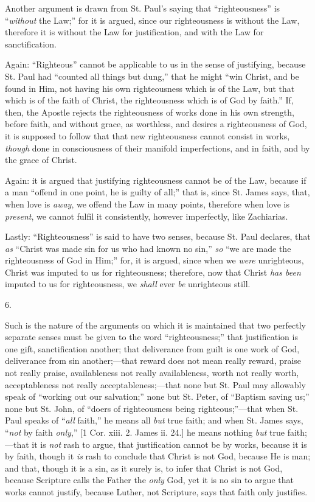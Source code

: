 Another argument is drawn from St. Paul's saying that
``righteousness'' is ``\emph{without} the Law;'' for
it is argued, since our righteousness is without the Law, therefore it
is without the Law for justification, and with the Law for
sanctification.

Again: ``Righteous'' cannot be applicable to us in the
sense of justifying, because St. Paul had ``counted all things but
dung,'' that he might ``win Christ, and be found in Him, not
having his own righteousness which is of the Law, but that which is of
the faith of Christ, the righteousness which is of God by faith.''
If, then, the Apostle rejects the righteousness of works done in his
own strength, before faith, and without grace, as worthless, and
desires a righteousness of God, it is supposed to follow that that new
righteousness cannot consist in works, \emph{though} done in
consciousness of their manifold imperfections, and in faith, and by
the grace of Christ.

Again: it is argued that justifying righteousness cannot be of the
Law, because if a man ``offend in one point, he is guilty of
all;'' that is, since St. James says, that, when love is \emph{away},
we offend the Law in many points, therefore when love is \emph{present},
we cannot fulfil it consistently, however imperfectly, like Zachiarias.

Lastly: ``Righteousness'' is said to have two senses,
because St. Paul declares, that \emph{as} ``Christ was made sin
for us who had known no sin,'' \emph{so} ``we are made the
righteousness of God in Him;'' for, it is argued, since when we \emph{were}
unrighteous, Christ was imputed to us for righteousness; therefore,
now that Christ \emph{has been} imputed to us for righteousness, we \emph{shall}
ever \emph{be} unrighteous still.

6.

Such is the nature of the arguments on which it is maintained that
two perfectly separate senses must be given to the word
``righteousness;'' that justification is one gift,
sanctification another; that deliverance from guilt is one work of
God, deliverance from sin another;—that reward does not mean really
reward, praise not really praise, availableness not really
availableness, worth not really worth, acceptableness not really
acceptableness;—that none but St. Paul may allowably speak of
``working out our salvation;'' none but St. Peter, of
``Baptism saving us;'' none but St. John, of ``doers of
righteousness being righteous;''—that when St. Paul speaks of
``\emph{all} faith,'' he means all \emph{but} true faith; and
when St. James says, ``\emph{not} by faith \emph{only},'' [1 Cor.
xiii. 2. James ii. 24.] he means nothing \emph{but} true faith;—that
it is \emph{not} rash to argue, that justification cannot be by works,
because it is by faith, though it \emph{is} rash to conclude that
Christ is not God, because He is man; and that, though it is a sin, as
it surely is, to infer that Christ is not God, because Scripture calls
the Father the \emph{only} God, yet it is no sin to argue that works
cannot justify, because Luther, not Scripture, says that faith only
justifies.

